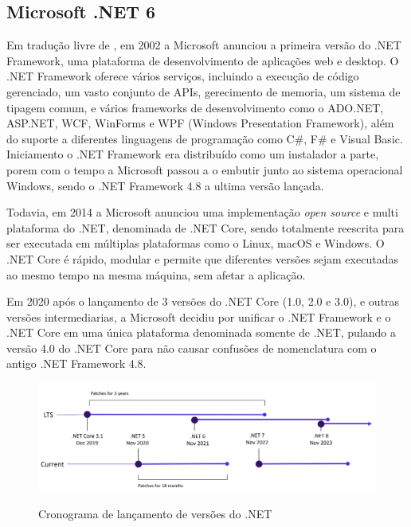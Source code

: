 \subsection{Microsoft .NET 6}

Em tradução livre de \cite{Akella:2022}, em 2002 a Microsoft anunciou a primeira
versão do .NET Framework, uma plataforma de desenvolvimento de aplicações
web e desktop. O .NET Framework oferece vários serviços, incluindo a
execução de código gerenciado, um vasto conjunto de APIs, gerecimento
de memoria, um sistema de tipagem comum, e vários frameworks de desenvolvimento
como o ADO.NET, ASP.NET, WCF, WinForms e WPF (Windows Presentation Framework),
além do suporte a diferentes linguagens de programação como C\#, F\# e Visual Basic.
Iniciamento o .NET Framework era distribuído como um instalador a parte, porem
com o tempo a Microsoft passou a o embutir junto ao sistema operacional Windows,
sendo o .NET Framework 4.8 a ultima versão lançada.

Todavia, em 2014 a Microsoft anunciou uma implementação \emph{open source} e
multi plataforma do .NET, denominada de .NET Core, sendo totalmente reescrita
para ser executada em múltiplas plataformas como o Linux, macOS e Windows.
O .NET Core é rápido, modular e permite que diferentes versões sejam
executadas ao mesmo tempo na mesma máquina, sem afetar a aplicação.

Em 2020 após o lançamento de 3 versões do .NET Core (1.0, 2.0 e 3.0), e outras
versões intermediarias, a Microsoft decidiu por unificar o .NET Framework e o
.NET Core em uma única plataforma denominada somente de .NET, pulando a
versão 4.0 do .NET Core para não causar confusões de nomenclatura
com o antigo .NET Framework 4.8.

\begin{figure}[htb]
    \caption{Cronograma de lançamento de versões do .NET}
    \centering
    \includegraphics[scale=0.18]{img/dotnet-release-schedule.png}
    \label{fig:dotnet-release-schedule}
\end{figure}

